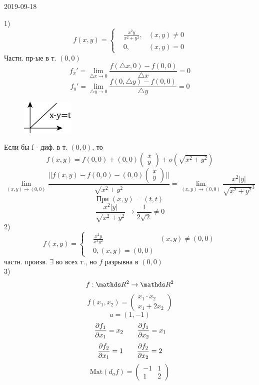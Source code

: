 \documentclass[main]{subfiles}
\begin{document}
\begin{lect} {2019-09-18}
		\begin{example}
			1)
				\[f(x, y) = \left\{ \begin{align}
						& \frac{x^2 y}{x^2 + y^2}, & (x, y) \neq 0\\
						& 0, & (x, y) = 0
				\end{align}\]
				Частн. пр-ые в т. $(0, 0)$
				\[f_x' = \lim_{\triangle x \to 0} \frac{f(\triangle x, 0) - f(0, 0)}{\triangle x} = 0 \]
				\[f_y' = \lim_{\triangle y \to 0} \frac{f(0, \triangle y) - f(0, 0)}{\triangle y} = 0\]
				\begin{figure}[H]
						\includegraphics[width = 2.5cm]{pics/4_1}
						\centering
				\end{figure}
				Если бы f - диф. в т. $(0, 0)$, то
				\[f(x, y) = f(0, 0) + (0, 0) \begin{pmatrix}
					x\\
					y
				\end{pmatrix}
				+ o(\sqrt{x^2 + y^2})
			\]
			\[\lim_{(x, y) \to (0, 0)} \frac{||f(x, y) - f(0, 0) - (0, 0) \begin{pmatrix}
				x\\
				y
			\end{pmatrix}||}{\sqrt{x^2 + y^2}} =
				\lim_{(x, y) \to (0, 0)} \frac{x^2|y|}{ \sqrt{x^2 + y^2}^3} \]
				\[\text{При } (x, y) = (t, t)\]
				\[\frac{x^2|y|}{\sqrt{x^2 + y^2}} \to \frac{1}{2\sqrt{2}} \neq 0\]
				2)
				\[f(x, y) = \left\{ \begin{align}
						&\frac{x^2 y}{x^4 y^2} & (x, y) \neq (0, 0)\\
						&0 , (x, y) = (0, 0)
						\end{align}\]
				частн. произв. $\exists$ во всех т., но $f$ разрывна в $(0, 0)$\\
				3)
				\[f: \R^2 \to \R^2\]
				\[f(x_1, x_2) = \begin{pmatrix}
					x_1 \cdot x_2\\
					x_1 + 2x_2
				\end{pmatrix}\]
				\[a = (1, -1)\]
				\[\frac{\partial f_1}{\partial x_1} = x_2 \quad\quad \frac{\partial f_1}{\partial x_2} = x_1\]
				\[\frac{\partial f_2}{\partial x_1} = 1 \quad\quad \frac{\partial f_2}{\partial x_2} = 2\]
				\[\text{Mat}(d_a f) = \begin{pmatrix}
					-1 & 1\\
					1 & 2

\end{pmatrix}\]
\end{example}
\end{lect}
\end{document}
